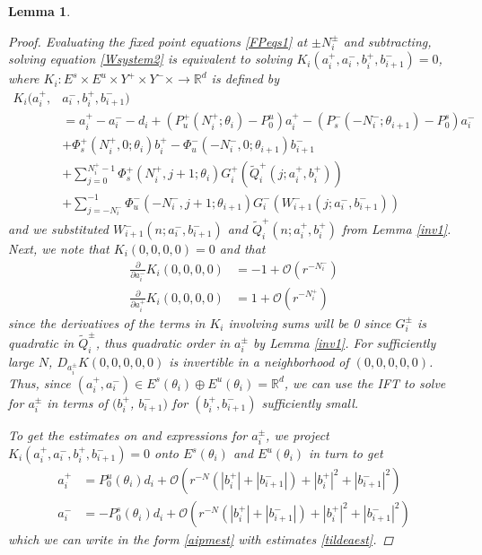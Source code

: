 \documentclass[12pt]{article}
\def\R{{\mathbb R}}
\newtheorem{lemma}{Lemma}
\begin{document}
\begin{lemma}
\begin{proof}
Evaluating the fixed point equations \eqref{FPeqs1} at $\pm N_i^\pm$ and subtracting, solving equation \eqref{Wsystem2} is equivalent to solving $K_i(a_i^+, a_i^-, b_i^+, b_{i+1}^-) = 0$, where $K_i: E^s \times E^u \times Y^+ \times Y^- \times \rightarrow \R^d$ is defined by
\begin{align*}
K_i(a_i^+, &a_i^-, b_i^+, b_{i+1}^-) \\
&= a_i^+ - a_i^- - d_i + (P_u^+(N_i^+; \theta_i) - P_0^u) a_i^+ - (P_s^-(-N_i^-; \theta_{i+1}) - P_0^s) a_i^- \\
&+ \Phi_s^+(N_i^+, 0; \theta_i) b_i^+ - \Phi_u^-(-N_i^-, 0; \theta_{i+1}) b_{i+1}^- \\
&+ \sum_{j = 0}^{N_i^+-1} \Phi_s^+(N_i^+, j+1; \theta_i) G_i^+(\tilde{Q}_i^+(j; a_i^+, b_i^+)) \\
&+ \sum_{j = -N_i^-}^{-1} \Phi_u^-(-N_i^-, j+1; \theta_{i+1}) G_i^-(W_{i+1}^-(j; a_i^-, b_{i+1}^-))
\end{align*}
and we substituted $W_{i+1}^-(n; a_i^-, b_{i+1}^-)$ and $\tilde{Q}_i^+(n; a_i^+, b_i^+)$ from Lemma \ref{inv1}. Next, we note that $K_i(0,0,0,0) = 0$ and that 
\begin{align*}
\frac{\partial}{\partial a_i^-} K_i(0, 0, 0, 0) &= -1 + \mathcal{O}(r^{-N_i^-}) \\
\frac{\partial}{\partial a_i^+} K_i(0, 0, 0, 0) &= 1 + \mathcal{O}(r^{-N_i^+})
\end{align*}
since the derivatives of the terms in $K_i$ involving sums will be 0 since $G_i^\pm$ is quadratic in $\tilde{Q}_i^\pm$, thus quadratic order in $a_i^\pm$ by Lemma \ref{inv1}. For sufficiently large $N$, $D_{a_i^\pm} K(0, 0, 0, 0, 0)$ is invertible in a neighborhood of $(0, 0, 0, 0, 0)$. Thus, since $(a_i^+, a_i^-) \in E^s(\theta_i) \oplus E^u(\theta_i) = \R^d$, we can use the IFT to solve for $a_i^\pm$ in terms of $(b_i^+$, $b_{i+1}^-)$ for $(b_i^+, b_{i+1}^-)$ sufficiently small.

To get the estimates on and expressions for $a_i^\pm$, we project $K_i(a_i^+, a_i^-, b_i^+, b_{i+1}^-) = 0$ onto $E^s(\theta_i)$ and $E^u(\theta_i)$ in turn to get 
\begin{align*}
a_i^+ &= P_0^u(\theta_i) d_i + \mathcal{O}(r^{-N}(|b_i^+|+|b_{i+1}^-|) + |b_i^+|^2+|b_{i+1}^-|^2) \\
a_i^- &= -P_0^s(\theta_i) d_i + \mathcal{O}(r^{-N}(|b_i^+|+|b_{i+1}^-|) + |b_i^+|^2+|b_{i+1}^-|^2)
\end{align*}
which we can write in the form \eqref{aipmest} with estimates \eqref{tildeaest}. 


\end{proof}
\end{lemma}
\end{document}
